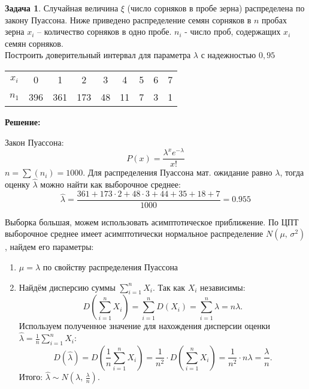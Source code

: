 \documentclass[a4paper,11pt]{article}
\newenvironment{shdd}{\begin{mdframed}[backgroundcolor=shadecolor]}{\end{mdframed}}
\theoremstyle{definition}
\newtheorem{problem}{Задача}\setlength{\parindent}{0pt}
\newenvironment{solution}
{\begin{shdd}\textbf{Решение:}\par\setlength{\parindent}{0pt}}
{\end{shdd}}
\begin{document}
\vspace{10pt}
\begin{problem}
    Случайная величина \(\xi\) (число сорняков в пробе зерна) распределена по закону
    Пуассона. Ниже приведено распределение семян сорняков в \(n\) пробах зерна \(x_i\) –
    количество сорняков в одно пробе. \(n_i\) - число проб, содержащих \(x_i\) семян сорняков.
    \\Построить доверительный интервал для параметра \(\lambda\) с надежностью \(0,95\)
    \begin{table}[H]
        \centering
        \begin{adjustbox}{max width=\textwidth}
            \begin{tabular}{c c c c c c c c c}
                \toprule
                \midrule
                    \(x_i\) & 0   & 1   & 2   & 3  & 4 & 5 & 6 & 7 \\
                    \(n_1\) & 396 & 361 & 173 & 48 & 11 & 7 & 3 & 1 \\
            \bottomrule
            \end{tabular}
        \end{adjustbox}
    \end{table}  

    
    \begin{solution}
        Закон Пуассона: 
        \[
        P(x) = \frac{\lambda^x e^{-\lambda}}{x!} 
        \]
        \(n = \sum(n_i) = 1000\). Для распределения Пуассона мат. ожидание равно \(\lambda\), 
        тогда оценку \(\hat{\lambda}\) можно найти как выборочное среднее: 
        \[
        \hat{\lambda} = \frac{361 + 173\cdot2 + 48\cdot3 + 44 + 35 + 18 + 7}{1000} = 0.955
        \] 

        Выборка большая, можем использовать асимптотическое приближение. По ЦПТ выборочное среднее 
        имеет асимптотически нормальное распределение \(N(\mu,\, \sigma^2)\), найдем его параметры:
        \begin{enumerate}
            \item \(\mu = \lambda\) по свойству распределения Пуассона
            \item Найдём дисперсию суммы \( \sum_{i=1}^n X_i \). Так как \(X_i\) независимы:
            \[
            D\left(\sum_{i=1}^n X_i\right) = \sum_{i=1}^n D(X_i) = \sum_{i=1}^n \lambda = n\lambda.
            \]
            Используем полученное значение для нахождения дисперсии оценки \(\hat{\lambda} = \frac{1}{n} \sum_{i=1}^n X_i\):
            \[
            D(\hat{\lambda}) = D\left(\frac{1}{n} \sum_{i=1}^n X_i \right) 
            = \frac{1}{n^2} \cdot D\left(\sum_{i=1}^n X_i\right) 
            = \frac{1}{n^2} \cdot n\lambda = \frac{\lambda}{n}.
            \]
            Итого: \(\hat{\lambda} \sim N\left(\lambda,\, \frac{\lambda}{n}\right).\)
        \end{enumerate}


\end{solution}
\end{problem}
\end{document}

